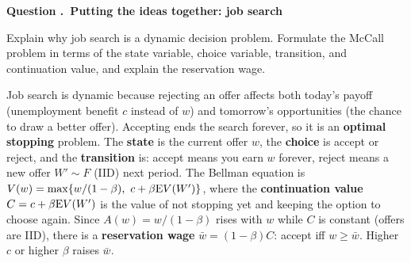 \documentclass[11pt]{article}
\newcounter{qn}
\newcommand{\question}[1]{\refstepcounter{qn}\par\medskip
{\bfseries\color{ink}Question \theqn.\ #1}\par\smallskip}
\begin{document}
\question{Putting the ideas together: job search}
Explain why job search is a dynamic decision problem. Formulate the McCall problem in terms of the state variable, choice variable, transition, and continuation value, and explain the reservation wage.

\begin{answer}
\begin{minipage}[t]{0.56\textwidth}\vspace{0pt}
Job search is dynamic because rejecting an offer affects both today's payoff (unemployment benefit $c$ instead of $w$) and tomorrow's opportunities (the chance to draw a better offer). Accepting ends the search forever, so it is an \textbf{optimal stopping} problem. The \textbf{state} is the current offer $w$, the \textbf{choice} is accept or reject, and the \textbf{transition} is: accept means you earn $w$ forever, reject means a new offer $W'\sim F$ (IID) next period. The Bellman equation is $V(w)=\max\{w/(1-\beta),\ c+\beta\mathrm{E} V(W')\}$, where the \textbf{continuation value} $C=c+\beta\mathrm{E} V(W')$ is the value of not stopping yet and keeping the option to choose again. Since $A(w)=w/(1-\beta)$ rises with $w$ while $C$ is constant (offers are IID), there is a \textbf{reservation wage} $\bar w=(1-\beta)C$: accept iff $w\ge\bar w$. Higher $c$ or higher $\beta$ raises $\bar w$.
\end{minipage}\hfill
\begin{minipage}[t]{0.4\textwidth}\vspace{0pt}\centering
\figMcCall
\end{minipage}
\end{answer}
\end{document}
